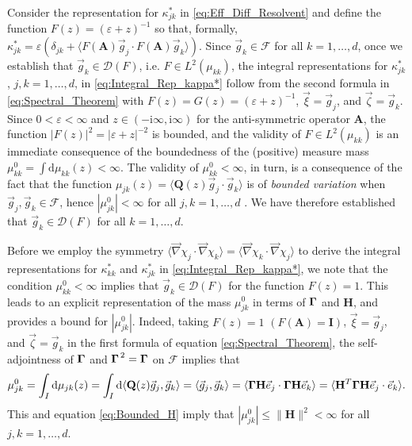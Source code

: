 \documentclass[11pt]{amsart}
\newcommand{\I}{\mathrm{i}}
\renewcommand{\d}{\mathrm{d}}
\newcommand{\Hb}{\mathbf{H}}
\newcommand{\Ib}{\mathbf{I}}
\newcommand{\Ab}{\mathbf{A}}
\newcommand{\Qb}{\mathbf{Q}}
\newcommand{\Ds}{\mathscr{D}}
\newcommand{\Fs}{\mathscr{F}}
\newcommand\bGamma{\mbox{\boldmath${\Gamma}$}}
\begin{document}
Consider the representation for $\kappa^*_{jk}$ in
\eqref{eq:Eff_Diff_Resolvent} and define the function
$F(z)=(\varepsilon+z)^{-1}$ so that, formally,
$\kappa^*_{jk}=\varepsilon(\delta_{jk}+\langle F(\Ab)\vec{g}_j\cdot F(\Ab)\vec{g}_k\rangle)$. Since
$\vec{g}_k\in\Fs$ for all $k=1,\ldots,d$, once we establish that
$\vec{g}_k\in\Ds(F)$, i.e. $F\in L^2(\mu_{kk})$, the integral representations
for $\kappa^*_{jk}$, $j,k=1,\ldots,d$, in \eqref{eq:Integral_Rep_kappa*} follow
from the second formula in \eqref{eq:Spectral_Theorem} with
$F(z)=G(z)=(\varepsilon+z)^{-1}$, $\vec{\xi}=\vec{g}_j$, and
$\vec{\zeta}=\vec{g}_k$. Since $0<\varepsilon<\infty$ and 
$z\in(-\I\infty,\I\infty)$ for the anti-symmetric operator $\Ab$, the function
$|F(z)|^2=|\varepsilon+z|^{-2}$ is bounded, and the validity of $F\in L^2(\mu_{kk})$ is
an immediate consequence of the boundedness of the (positive) measure
mass $\mu^0_{kk}=\int\d\mu_{kk}(z)<\infty$. The validity of $\mu^0_{kk}<\infty$, in turn,
is a consequence of the fact that the function
$\mu_{jk}(z)=\langle\Qb(z)\vec{g}_j\cdot\vec{g}_k\rangle$ is of \emph{bounded
  variation} when $\vec{g}_j,\vec{g}_k\in\Fs$, hence
$|\mu^0_{jk}|<\infty$ for all $j,k=1,\ldots,d$ \cite{Stone:64}. We have therefore
established that $\vec{g}_k\in\Ds(F)$ for all $k=1,\ldots,d$.     




Before we employ the symmetry
$\langle\vec{\nabla}\chi_j\cdot\vec{\nabla}\chi_k\rangle=\langle\vec{\nabla}\chi_k\cdot\vec{\nabla}\chi_j\rangle$ to derive the 
integral representations for $\kappa^*_{kk}$ and $\kappa^*_{jk}$ in
\eqref{eq:Integral_Rep_kappa*},  we note that the condition
$\mu^0_{kk}<\infty$ implies that $\vec{g}_k\in\Ds(F)$ for the function 
$F(z)=1$. This leads to an explicit representation of the mass
$\mu^0_{jk}$ in terms of $\bGamma$ and $\Hb$, and provides a bound for
$|\mu^0_{jk}|$. Indeed, taking $F(z)=1$ $(F(\Ab)=\Ib)$, 
$\vec{\xi}=\vec{g}_j$, and $\vec{\zeta}=\vec{g}_k$ in the first formula of
equation \eqref{eq:Spectral_Theorem}, the self-adjointness of $\bGamma$
and $\bGamma^{\,2}=\bGamma$ on $\Fs$ implies that   
%
\begin{align}\label{eq:Mass}
  \mu^0_{jk}=\int_I\d\mu_{jk}(z)
        =\int_I\d\langle\Qb(z)\vec{g}_j,\vec{g}_k\rangle
        =\langle\vec{g}_j,\vec{g}_k\rangle
        =\langle\bGamma\Hb\vec{e}_j\cdot\bGamma\Hb\vec{e}_k\rangle 
        =\langle\Hb^T\bGamma\Hb\vec{e}_j\cdot\vec{e}_k\rangle.     
\end{align}
%
This and equation \eqref{eq:Bounded_H} imply that
$|\mu^0_{jk}|\leq\|\Hb\|^2<\infty$ for all $j,k=1,\ldots,d$.  
\end{document}
